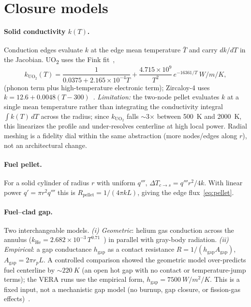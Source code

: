 \documentclass[11pt]{article}
\begin{document}
\section{Closure models}\label{sec:closure}
\paragraph{Solid conductivity $k(T)$.} Conduction edges evaluate $k$ at the edge
mean temperature $\bar T$ and carry $dk/dT$ in the Jacobian. UO\textsubscript{2}
uses the Fink fit~\cite{fink},
\begin{equation}
k_{\mathrm{UO_2}}(T)=\frac{1}{0.0375+2.165\times10^{-4}T}
+\frac{4.715\times10^{9}}{T^2}\,e^{-16361/T}\ \si{W/m/K},
\end{equation}
(phonon term plus high-temperature electronic term); Zircaloy-4 uses
$k=12.6+0.0048(T-300)$~\cite{matpro}. \emph{Limitation:} the two-node pellet
evaluates $k$ at a single mean temperature rather than integrating the
conductivity integral $\int k(T)\,dT$ across the radius; since $k_{\mathrm{UO_2}}$
falls $\sim$3$\times$ between \SI{500}{K} and \SI{2000}{K}, this linearizes the
profile and under-resolves centerline at high local power. Radial meshing is a
fidelity dial within the same abstraction (more nodes/edges along $r$), not an
architectural change.

\paragraph{Fuel pellet.} For a solid cylinder of radius $r$ with uniform
$q'''$, $\Delta T_{c\to s}=q'''r^2/4k$. With linear power $q'=\pi r^2 q'''$ this is
$R_\text{pellet}=1/(4\pi k L)$, giving the edge flux~\eqref{eq:pellet}.

\paragraph{Fuel--clad gap.} Two interchangeable models.
\emph{(i) Geometric}: helium gas conduction across the annulus
($k_\text{He}=2.682\times10^{-3}\,T^{0.71}$~\cite{petersen}) in parallel with
gray-body radiation. \emph{(ii) Empirical}: a gap conductance $h_\text{gap}$ as a
contact resistance $R=1/(h_\text{gap}A_\text{gap})$, $A_\text{gap}=2\pi r_p L$.
A controlled comparison showed the geometric model over-predicts fuel centerline
by ${\sim}\SI{220}{K}$ (an open hot gap with no contact or temperature-jump
terms); the VERA runs use the empirical form, $h_\text{gap}=\SI{7500}{W/m^2/K}$.
This is a fixed input, not a mechanistic gap model (no burnup, gap closure, or
fission-gas effects)~\cite{todreas}.
\end{document}
